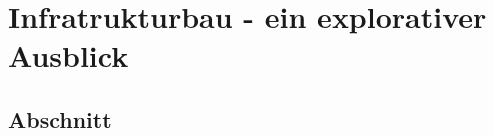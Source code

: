 \chapter{Infratrukturbau - ein explorativer Ausblick}
\label{ch:infrastrukturbau}

\section{Abschnitt}
\label{sec: 7}